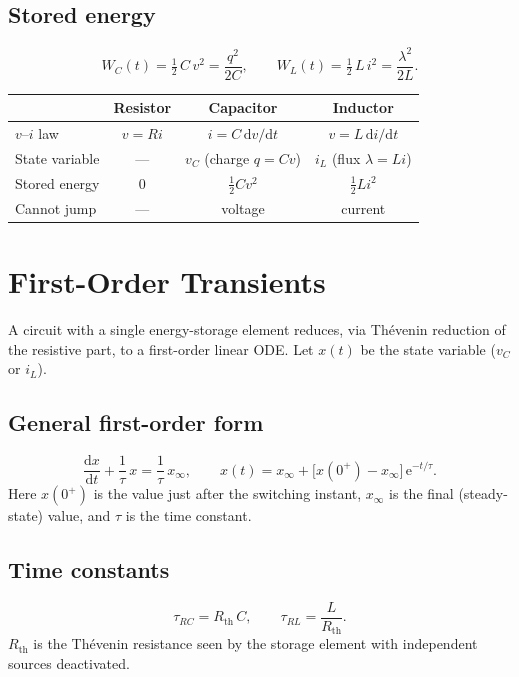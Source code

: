 \documentclass[11pt,a4paper]{article}
\newcommand{\dd}{\mathrm{d}}
\newcommand{\ee}{\mathrm{e}}
\begin{document}
\subsection{Stored energy}
\[
  W_C(t) = \tfrac{1}{2}\,C\,v^2 = \frac{q^2}{2C}, \qquad
  W_L(t) = \tfrac{1}{2}\,L\,i^2 = \frac{\lambda^2}{2L}.
\]

\begin{center}
\begin{tabular}{@{}lccc@{}}
\hline
 & \textbf{Resistor} & \textbf{Capacitor} & \textbf{Inductor}\\
\hline
$v$--$i$ law      & $v=Ri$                 & $i=C\,\dd v/\dd t$        & $v=L\,\dd i/\dd t$\\
State variable    & ---                    & $v_C$ (charge $q=Cv$)    & $i_L$ (flux $\lambda=Li$)\\
Stored energy     & $0$                    & $\tfrac12 C v^2$         & $\tfrac12 L i^2$\\
Cannot jump       & ---                    & voltage                  & current\\
\hline
\end{tabular}
\end{center}

\section{First-Order Transients}

A circuit with a single energy-storage element reduces, via Th\'evenin
reduction of the resistive part, to a first-order linear ODE. Let $x(t)$ be the
state variable ($v_C$ or $i_L$).

\subsection{General first-order form}
\[
  \frac{\dd x}{\dd t} + \frac{1}{\tau}\,x = \frac{1}{\tau}\,x_\infty,
  \qquad
  x(t) = x_\infty + \bigl[x(0^+) - x_\infty\bigr]\,\ee^{-t/\tau}.
\]
Here $x(0^+)$ is the value just after the switching instant, $x_\infty$ is the
final (steady-state) value, and $\tau$ is the time constant.

\subsection{Time constants}
\[
  \tau_{RC} = R_{\mathrm{th}}\,C, \qquad \tau_{RL} = \frac{L}{R_{\mathrm{th}}} .
\]
$R_{\mathrm{th}}$ is the Th\'evenin resistance seen by the storage element with
independent sources deactivated.
\end{document}
